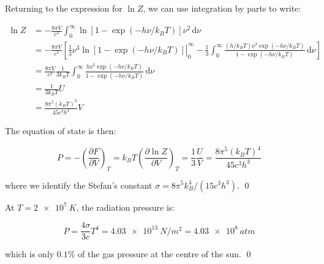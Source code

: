 \documentclass[12pt]{article}
\begin{document}
Returning to the expression for $\ln{Z}$, we can use integration by parts to write:

\begin{equation}
    \begin{split}
        \ln{Z} &= -\frac{8\pi V}{c^{3}} \int_{0}^{\infty} \ln{\left[ 1 - \exp\left( -h \nu/k_{B}T \right) \right]} \nu^{2} \, \mathrm{d}\nu \\
        &= -\frac{8\pi V}{c^{3}} \left[ \left. \frac{1}{3} \nu^{3} \ln{\left[ 1 - \exp\left( -h \nu/k_{B}T \right) \right]} \right|_{0}^{\infty} - \frac{1}{3} \int_{0}^{\infty} \frac{(h/k_{B} T) \nu^{3} \exp\left( -h \nu/k_{B}T \right)}{1 - \exp\left( -h \nu/k_{B}T \right)} \, \mathrm{d}\nu \right] \\
        &= \frac{8\pi V}{c^{3}} \frac{1}{3k_{B} T} \int_{0}^{\infty} \frac{h \nu^{3} \exp\left( -h \nu/k_{B}T \right)}{1 - \exp\left( -h \nu/k_{B}T \right)} \, \mathrm{d}\nu \\
        &= \frac{1}{3k_{B} T} U \\
        &= \frac{8\pi^{5} (k_{B}T)^{3}}{45c^{3} h^{3}} V
    \end{split}
\end{equation}

The equation of state is then:

\begin{equation}
    P = -\left( \frac{\partial F}{\partial V} \right)_{T} = k_{B}T \left( \frac{\partial \ln{Z}}{\partial V} \right)_{T} = \frac{1}{3} \frac{U}{V} = \frac{8\pi^{5} (k_{B}T)^{4}}{45c^{3} h^{3}}
\end{equation}

where we identify the Stefan's constant $\sigma = 8\pi^{5} k_{B}^{4}/(15c^{3} h^{3})$.
\qed


At $T = \qty{2e7}{K}$, the radiation pressure is:

\begin{equation}
    P = \frac{4\sigma}{3c} T^{4} = \qty{4.03e13}{N/m^{2}} = \qty{4.03e8}{atm}
\end{equation}

which is only $0.1\%$ of the gas pressure at the centre of the sun.
\qed
\end{document}
